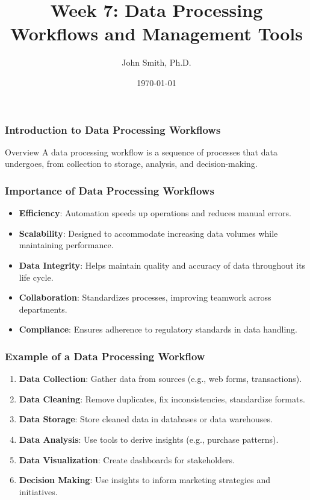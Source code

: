 \documentclass[aspectratio=169]{beamer}
\title[Data Processing]{Week 7: Data Processing Workflows and Management Tools}
\author[J. Smith]{John Smith, Ph.D.}
\institute[University Name]{
  Department of Computer Science\\
  University Name\\
  \vspace{0.3cm}
  Email: email@university.edu\\
  Website: www.university.edu
}
\date{\today}
\begin{document}
\frame{\titlepage}

\begin{frame}[fragile]
    \frametitle{Introduction to Data Processing Workflows}
    \begin{block}{Overview}
        A data processing workflow is a sequence of processes that data undergoes, from collection to storage, analysis, and decision-making.
    \end{block}
\end{frame}

\begin{frame}[fragile]
    \frametitle{Importance of Data Processing Workflows}
    \begin{itemize}
        \item \textbf{Efficiency}: Automation speeds up operations and reduces manual errors.
        \item \textbf{Scalability}: Designed to accommodate increasing data volumes while maintaining performance.
        \item \textbf{Data Integrity}: Helps maintain quality and accuracy of data throughout its life cycle.
        \item \textbf{Collaboration}: Standardizes processes, improving teamwork across departments.
        \item \textbf{Compliance}: Ensures adherence to regulatory standards in data handling.
    \end{itemize}
\end{frame}

\begin{frame}[fragile]
    \frametitle{Example of a Data Processing Workflow}
    \begin{enumerate}
        \item \textbf{Data Collection}: Gather data from sources (e.g., web forms, transactions).
        \item \textbf{Data Cleaning}: Remove duplicates, fix inconsistencies, standardize formats.
        \item \textbf{Data Storage}: Store cleaned data in databases or data warehouses.
        \item \textbf{Data Analysis}: Use tools to derive insights (e.g., purchase patterns).
        \item \textbf{Data Visualization}: Create dashboards for stakeholders.
        \item \textbf{Decision Making}: Use insights to inform marketing strategies and initiatives.
    \end{enumerate}
\end{frame}
\end{document}
